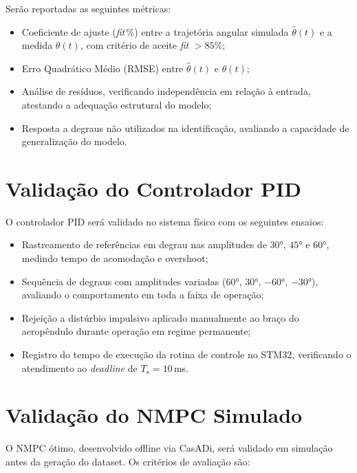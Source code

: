 Serão reportadas as seguintes métricas:

\begin{itemize}
    \item Coeficiente de ajuste (\textit{fit}\,\%) entre a trajetória angular simulada $\hat{\theta}(t)$ e a medida $\theta(t)$, com critério de aceite \textit{fit} $> 85\%$;
    \item Erro Quadrático Médio (RMSE) entre $\hat{\theta}(t)$ e $\theta(t)$;
    \item Análise de resíduos, verificando independência em relação à entrada, atestando a adequação estrutural do modelo;
    \item Resposta a degraus não utilizados na identificação, avaliando a capacidade de generalização do modelo.
\end{itemize}

\section{Validação do Controlador PID}

O controlador PID será validado no sistema físico com os seguintes ensaios:

\begin{itemize}
    \item Rastreamento de referências em degrau nas amplitudes de 
          $30°$, $45°$ e $60°$, medindo tempo de acomodação e overshoot;
    \item Sequência de degraus com amplitudes variadas 
          ($60°$, $30°$, $-60°$, $-30°$), avaliando o comportamento 
          em toda a faixa de operação;
    \item Rejeição a distúrbio impulsivo aplicado manualmente ao braço do aeropêndulo durante operação em regime permanente;
    \item Registro do tempo de execução da rotina de controle no STM32, verificando o atendimento ao \textit{deadline} de $T_s = 10$\,ms.
\end{itemize}

\section{Validação do NMPC Simulado}

O NMPC ótimo, desenvolvido offline via CasADi, será validado em simulação  antes da geração do dataset. Os critérios de avaliação são:

